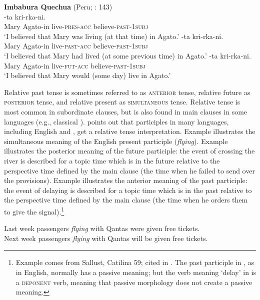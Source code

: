 \ea \label{ex:21.18}
\textbf{{Imbabura} Quechua} (Peru; \citealt{Cole1982}: 143)\\
\ea {}-ta  kri-rka-ni.\\
Mary  Agato-in  live-\textsc{pres}-\textsc{acc}  believe-\textsc{past}-\textsc{1subj} \\
\glt ‘I believed that Mary was living (at that time) in Agato.’
\ex  {}-ta  kri-rka-ni.\\
Mary  Agato-in  live-\textsc{past}-\textsc{acc}  believe-\textsc{past}-\textsc{1subj}\\
\glt ‘I believed that Mary had lived (at some previous time) in Agato.’
\ex {}-ta  kri-rka-ni.\\
Mary  Agato-in  live-\textsc{fut}-\textsc{acc}  believe-\textsc{past}-\textsc{1subj}\\
\glt ‘I believed that Mary would (some day) live in Agato.’
\z \z


Relative past tense is sometimes referred to as \textsc{anterior} tense, relative future as \textsc{posterior} tense, and relative present as \textsc{simultaneous} tense. Relative tense is most common in subordinate clauses, but is also found in main clauses in some languages (e.g., classical ). \citet{Comrie1985} points out that participles in many languages, including English and , get a relative tense interpretation. Example  illustrates the simultaneous meaning of the English present participle (\textit{flying}). Example  illustrates the posterior meaning of the  future participle: the event of crossing the river is described for a topic time which is in the future relative to the perspective time defined by the main clause (the time when he failed to send over the provisions). Example  illustrates the anterior meaning of the  past participle: the event of delaying is described for a topic time which is in the past relative to the perspective time defined by the main clause (the time when he orders them to give the signal).\footnote{Example  comes from Sallust, Catilina 59; cited in \citet[§496]{AllenGreenough1903}. The past participle in , as in English, normally has a passive meaning; but the verb meaning ‘delay’ in  is a \textsc{deponent} verb, meaning that passive morphology does not create a passive meaning.}


\ea \label{ex:21.19}
\ea  Last week passengers \textit{flying} with Qantas were given free tickets.\\
\ex Next week passengers \textit{flying} with Qantas will be given free tickets.
                       \z
\z

